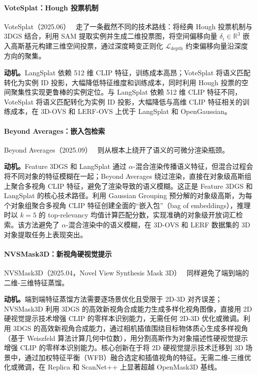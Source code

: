 \paragraph{VoteSplat：Hough 投票机制} VoteSplat（2025.06）~\cite{2506_22799} 走了一条截然不同的技术路线：将经典 Hough 投票机制与 3DGS 结合，利用 SAM 提取实例并生成二维投票图，将空间偏移向量 $\delta_i \in \mathbb{R}^3$ 嵌入高斯基元构建三维空间投票，通过深度畸变正则化 $\mathcal{L}_{\text{depth}}$ 约束偏移向量沿深度方向的聚集。

\textbf{动机。}LangSplat 依赖 512 维 CLIP 特征，训练成本高昂；VoteSplat 将语义匹配转化为实例 ID 投影，大幅降低特征维度和训练成本，同时利用 Hough 投票的空间聚集性实现更鲁棒的实例定位。与 LangSplat 依赖 512 维 CLIP 特征不同，VoteSplat 将语义匹配转化为实例 ID 投影，大幅降低与高维 CLIP 特征相关的训练成本，在 3D-OVS 和 LERF-OVS 上优于 LangSplat 和 OpenGaussian。

\paragraph{Beyond Averages：嵌入包检索} Beyond Averages（2025.09）~\cite{2509_12938} 则从根本上绕开了语义的可微分渲染瓶颈。

\textbf{动机。}Feature 3DGS 和 LangSplat 通过 $\alpha$-混合渲染传播语义特征，但混合过程会将不同对象的特征模糊在一起；Beyond Averages 绕过渲染，直接在对象级高斯组上聚合多视角 CLIP 特征，避免了渲染导致的语义模糊。这正是 Feature 3DGS 和 LangSplat 的核心技术路径。利用 Gaussian Grouping 预分解的对象级高斯，为每个对象组聚合多视角 CLIP 特征创建全面的``嵌入包''（bag of embeddings），推理时以 $k=5$ 的 top-relevancy 均值计算匹配分数，实现准确的对象级开放词汇检索。该方法避免了 $\alpha$-混合渲染中的语义模糊，在 3D-OVS 和 LERF 数据集的 3D 对象提取任务上表现突出。

\paragraph{NVSMask3D：新视角硬视觉提示} NVSMask3D（2025.04，Novel View Synthesis Mask 3D）~\cite{2504_14638} 同样避免了端到端的二维-三维特征蒸馏。

\textbf{动机。}端到端特征蒸馏方法需要逐场景优化且受限于 2D-3D 对齐误差；NVSMask3D 利用 3DGS 的高效新视角合成能力生成多样化视角图像，直接用 2D 硬视觉提示技术增强 CLIP 的零样本识别能力，无需任何 2D-3D 优化或微调。利用 3DGS 的高效新视角合成能力，通过相机插值围绕目标物体质心生成多样视角（基于 Weiszfeld 算法计算几何中位数），用分割高斯作为对象描述性硬视觉提示增强 CLIP 的零样本识别能力。核心创新在于将 2D 硬视觉提示技术迁移到 3D 场景中，通过加权特征平衡（WFB）融合选定和插值视角的特征。无需二维-三维优化或微调，在 Replica 和 ScanNet++ 上显著超越 OpenMask3D 基线。

